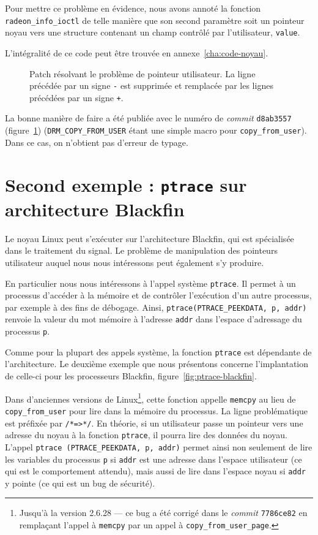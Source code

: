 Pour mettre ce problème en évidence, nous avons annoté la fonction
\texttt{radeon\_info\_ioctl} de telle manière que son second paramètre soit un
pointeur noyau vers une structure contenant un champ contrôlé par l'utilisateur,
\texttt{value}.

L'intégralité de ce code peut être trouvée en annexe~\ref{cha:code-noyau}.

\begin{figure}

  \caption[Patch résolvant le problème de pointeur utilisateur.]
      {Patch résolvant le problème de pointeur utilisateur.
       La ligne précédée par un signe \texttt{-} est supprimée et remplacée
       par les lignes précédées par un signe \texttt{+}.
      }
\label{fig:linux-patch}
\end{figure}

La bonne manière de faire a été publiée avec le numéro de \emph{commit}
\texttt{d8ab3557} (figure~\ref{fig:linux-patch}) (\texttt{DRM\_COPY\_FROM\_USER}
étant une simple macro pour \texttt{copy\_from\_user}). Dans ce cas, on
n'obtient pas d'erreur de typage.

\section{Second exemple : \texttt{ptrace} sur architecture Blackfin}

Le noyau Linux peut s'exécuter sur l'architecture Blackfin, qui est spécialisée
dans le traitement du signal. Le problème de manipulation des pointeurs
utilisateur auquel nous nous intéressons peut également s'y produire.

En particulier nous nous intéressons à l'appel système \texttt{ptrace}. Il
permet à un processus d'accéder à la mémoire et de contrôler l'exécution d'un
autre processus, par exemple à des fins de débogage. Ainsi,
\texttt{ptrace(PTRACE\_PEEKDATA, p, addr)} renvoie la valeur du mot mémoire à
l'adresse \texttt{addr} dans l'espace d'adressage du processus \texttt{p}.

Comme pour la plupart des appels système, la fonction \texttt{ptrace} est
dépendante de l'architecture. Le deuxième exemple que nous présentons concerne
l'implantation de celle-ci pour les processeurs Blackfin,
figure~\ref{fig:ptrace-blackfin}.

Dans d'anciennes versions de Linux\footnote{Jusqu'à la version 2.6.28 --- ce bug
a été corrigé dans le \emph{commit} \texttt{7786ce82} en remplaçant l'appel à
\texttt{memcpy} par un appel à \texttt{copy\_from\_user\_page}.}, cette fonction
appelle \texttt{memcpy} au lieu de \nolinkurl{copy\_from\_user} pour lire dans
la mémoire du processus. La ligne problématique est préfixée par
\texttt{/*=\textgreater{}*/}. En théorie, si un utilisateur passe un pointeur
vers une adresse du noyau à la fonction \texttt{ptrace}, il pourra lire des
données du noyau. L'appel \texttt{ptrace (PTRACE\_PEEKDATA, p, addr)} permet
ainsi non seulement de lire les variables du processus \texttt{p} si
\texttt{addr} est une adresse dans l'espace utilisateur (ce qui est le
comportement attendu), mais aussi de lire dans l'espace noyau si \texttt{addr} y
pointe (ce qui est un bug de sécurité).

